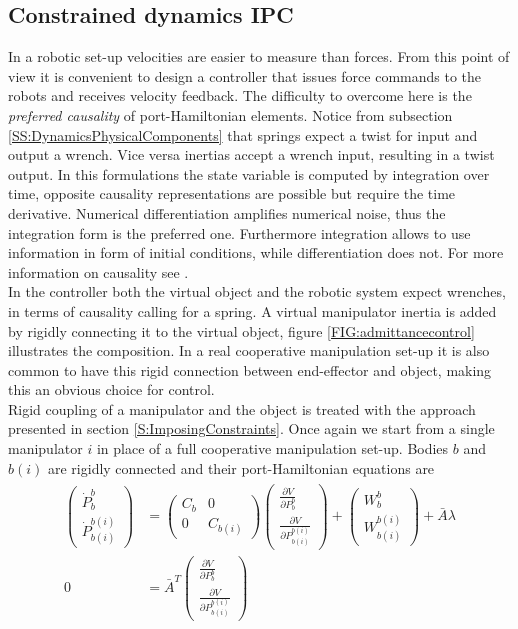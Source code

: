 \documentclass[a4paper,twoside, openright,12pt]{report}
\begin{document}
\subsection{Constrained dynamics IPC}\label{SS:constrainedDIPC}
In a robotic set-up velocities are easier to measure than forces. From this point of view it is convenient to design a controller that issues force commands to the robots and receives velocity feedback. The difficulty to overcome here is the \emph{preferred causality} of port-Hamiltonian elements. Notice from subsection \ref{SS:DynamicsPhysicalComponents} that springs expect a twist for input and output a wrench. Vice versa inertias accept a wrench input, resulting in a twist output. In this formulations the state variable is computed by integration over time, opposite causality representations are possible but require the time derivative. Numerical differentiation amplifies numerical noise, thus the integration form is the preferred one. Furthermore integration allows to use information in form of initial conditions, while differentiation does not. For more information on causality see \cite{duindam2009geoplexbook}.\\
 In the controller both the virtual object and the robotic system expect wrenches, in terms of causality calling for a spring. A virtual manipulator inertia is added by rigidly connecting it to the virtual object, figure \ref{FIG:admittancecontrol} illustrates the composition. In a real cooperative manipulation set-up it is also  common to  have this rigid connection between end-effector and object, making this an obvious choice for control. \\
Rigid coupling of a manipulator and the object is treated with the approach presented in section \ref{S:ImposingConstraints}. Once again we start from a single manipulator $i$ in place of a full cooperative manipulation set-up. Bodies $b$ and $b(i)$ are rigidly connected and their port-Hamiltonian equations are
\begin{eqnarray}
\begin{aligned}
\begin{pmatrix}
\dot{P}_b^b \\ \dot{P}_{b(i)}^{b(i)}
\end{pmatrix}
&=
\begin{pmatrix}
C_b & 0 \\ 0 & C_{b(i)} 
\end{pmatrix}
\begin{pmatrix} \frac{\partial V}{\partial P_b^b} \\ 
\frac{\partial V}{\partial P_{b(i)}^{b(i)}}
\end{pmatrix}
+
\begin{pmatrix}
W_b^b \\ W_{b(i)}^{b(i)}
\end{pmatrix}
+
\bar{A}\lambda 
\\
0 
&=
\bar{A}^T 
\begin{pmatrix} \frac{\partial V}{\partial P_b^b} \\ 
\frac{\partial V}{\partial P_{b(i)}^{b(i)}}
\end{pmatrix}
\end{aligned}
\end{eqnarray}
\end{document}
